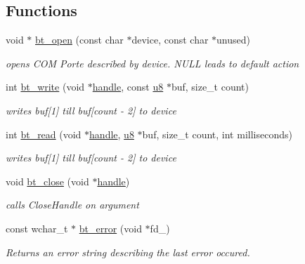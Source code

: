 \subsection*{Functions}
\begin{DoxyCompactItemize}
\item 
void $\ast$ \hyperlink{bt-win_8c_a4926e3ba996c4e77d68845713a09db0c}{bt\+\_\+open} (const char $\ast$device, const char $\ast$unused)
\begin{DoxyCompactList}\small\item\em opens C\+O\+M Porte described by device. {\ttfamily N\+U\+L\+L} leads to default action \end{DoxyCompactList}\item 
int \hyperlink{bt-win_8c_a4da84bfe7c552c082e73af8f28ff2af5}{bt\+\_\+write} (void $\ast$\hyperlink{ev3__io_8h_aa0fee4a3e0cbfef079dcc441aaf8a8bf}{handle}, const \hyperlink{defs_8h_a92c50087ca0e64fa93fc59402c55f8ca}{u8} $\ast$buf, size\+\_\+t count)
\begin{DoxyCompactList}\small\item\em writes buf\mbox{[}1\mbox{]} till buf\mbox{[}count -\/ 2\mbox{]} to device \end{DoxyCompactList}\item 
int \hyperlink{bt-win_8c_a5861a216864bb97223f98e631f0c667c}{bt\+\_\+read} (void $\ast$\hyperlink{ev3__io_8h_aa0fee4a3e0cbfef079dcc441aaf8a8bf}{handle}, \hyperlink{defs_8h_a92c50087ca0e64fa93fc59402c55f8ca}{u8} $\ast$buf, size\+\_\+t count, int milliseconds)
\begin{DoxyCompactList}\small\item\em writes buf\mbox{[}1\mbox{]} till buf\mbox{[}count -\/ 2\mbox{]} to device \end{DoxyCompactList}\item 
void \hyperlink{bt-win_8c_a66111b994dc31a22f27679a286c338e4}{bt\+\_\+close} (void $\ast$\hyperlink{ev3__io_8h_aa0fee4a3e0cbfef079dcc441aaf8a8bf}{handle})
\begin{DoxyCompactList}\small\item\em calls Close\+Handle on argument \end{DoxyCompactList}\item 
const wchar\+\_\+t $\ast$ \hyperlink{bt-win_8c_a91cd0489b6e5dc0973109579ca9c7a55}{bt\+\_\+error} (void $\ast$fd\+\_\+)
\begin{DoxyCompactList}\small\item\em Returns an error string describing the last error occured. \end{DoxyCompactList}\end{DoxyCompactItemize}



